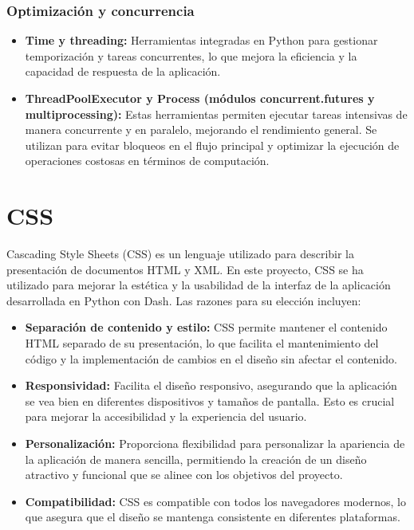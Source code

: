\subsubsection{Optimización y concurrencia}
\begin{itemize}
    \item \textbf{Time y threading:} Herramientas integradas en Python para gestionar temporización y tareas concurrentes, lo que mejora la eficiencia y la capacidad de respuesta de la aplicación.
    \item \textbf{ThreadPoolExecutor y Process (módulos concurrent.futures y multiprocessing):} Estas herramientas permiten ejecutar tareas intensivas de manera concurrente y en paralelo, mejorando el rendimiento general. Se utilizan para evitar bloqueos en el flujo principal y optimizar la ejecución de operaciones costosas en términos de computación.
\end{itemize}



\section{CSS}
Cascading Style Sheets (CSS) es un lenguaje utilizado para describir la presentación de documentos HTML y XML. En este proyecto, CSS se ha utilizado para mejorar la estética y la usabilidad de la interfaz de la aplicación desarrollada en Python con Dash. Las razones para su elección incluyen:

\begin{itemize}
    \item \textbf{Separación de contenido y estilo:} CSS permite mantener el contenido HTML separado de su presentación, lo que facilita el mantenimiento del código y la implementación de cambios en el diseño sin afectar el contenido.
    \item \textbf{Responsividad:} Facilita el diseño responsivo, asegurando que la aplicación se vea bien en diferentes dispositivos y tamaños de pantalla. Esto es crucial para mejorar la accesibilidad y la experiencia del usuario.
    \item \textbf{Personalización:} Proporciona flexibilidad para personalizar la apariencia de la aplicación de manera sencilla, permitiendo la creación de un diseño atractivo y funcional que se alinee con los objetivos del proyecto.
    \item \textbf{Compatibilidad:} CSS es compatible con todos los navegadores modernos, lo que asegura que el diseño se mantenga consistente en diferentes plataformas.
\end{itemize}

